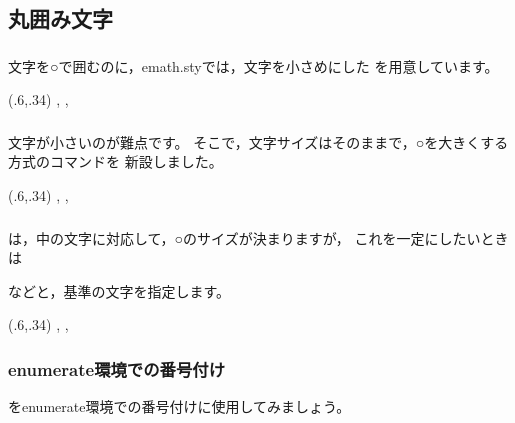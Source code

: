 \subsection{丸囲み文字}
\subsubsection{}
文字を○で囲むのに，\textsf{emath.sty}では，文字を小さめにした
を用意しています。

\begin{showEx}(.6,.34){}
, , 
\end{showEx}

\subsubsection{}
文字が小さいのが難点です。
そこで，文字サイズはそのままで，○を大きくする方式のコマンドを
新設しました。

\begin{showEx}(.6,.34){}
, , 
\end{showEx}

\subsubsection{}
は，中の文字に対応して，○のサイズが決まりますが，
これを一定にしたいときは
\begin{jquote}
\begin{verb}
\end{verb}
\end{jquote}
などと，基準の文字を指定します。

\begin{showEx}(.6,.34){}
, , 
\end{showEx}

\subsubsection{\textsf{enumerate}環境での番号付け}
を\textsf{enumerate}環境での番号付けに使用してみましょう。

